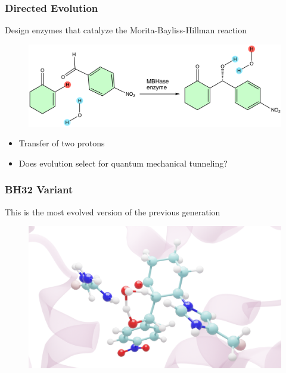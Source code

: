 \documentclass{beamer}
\begin{document}
\begin{frame}
\frametitle{Directed Evolution}
Design enzymes that catalyze the Morita-Bayliss-Hillman reaction
\begin{figure}
\centering
\includegraphics[scale=0.4]{figures/mbh-reaction.png}
\end{figure}
\begin{itemize}[<+-|alert@+>]
\item{Transfer of two protons}
\item{Does evolution select for quantum mechanical tunneling?}
\end{itemize}

\end{frame}
\begin{frame}
\frametitle{BH32 Variant}
This is the most evolved version of the previous generation 
\begin{figure}
\centering
\includegraphics[scale=0.1]{figures/trans-120.png}
\end{figure}
\end{frame}
\end{document}
